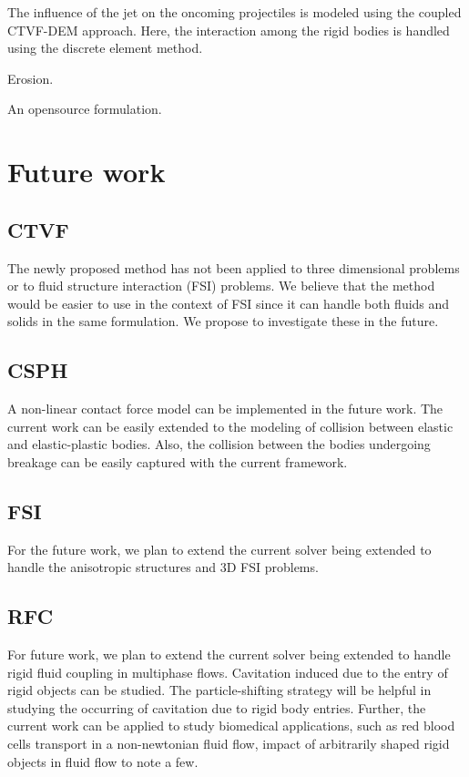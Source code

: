The influence of the jet on the oncoming projectiles is modeled using the
coupled CTVF-DEM approach. Here, the interaction among the rigid bodies is
handled using the discrete element method.

Erosion.

An opensource formulation.

\section{Future work}\label{conclusions:future_work}

\subsection{CTVF}
The newly proposed method has not been applied to three dimensional problems
or to fluid structure interaction (FSI) problems. We believe that the method
would be easier to use in the context of FSI since it can handle both fluids
and solids in the same formulation. We propose to investigate these in the
future.


\subsection{CSPH}
A non-linear contact force model can be implemented in the future work. The
current work can be easily extended to the modeling of collision between
elastic and elastic-plastic bodies. Also, the collision between the bodies
undergoing breakage can be easily captured with the current framework.


\subsection{FSI}
For the future work, we plan to extend the current solver being extended to handle
the anisotropic structures and 3D FSI problems.


\subsection{RFC}
For future work, we plan to extend the current solver being extended to handle
rigid fluid coupling in multiphase flows. Cavitation induced due to the entry
of rigid objects can be studied. The particle-shifting strategy will be
helpful in studying the occurring of cavitation due to rigid body entries.
Further, the current work can be applied to study biomedical applications,
such as red blood cells transport in a non-newtonian fluid flow, impact of
arbitrarily shaped rigid objects in fluid flow to note a few.


